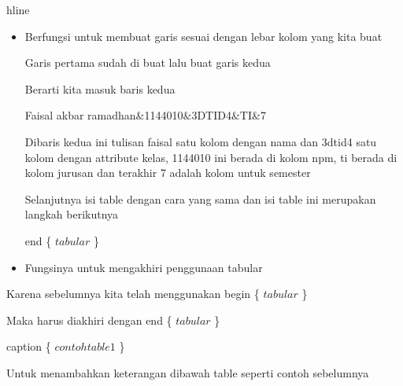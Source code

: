 \vspace{\baselineskip}
\noindent hline\par
\vspace{\baselineskip}

\begin{itemize}
	\item Berfungsi untuk membuat garis sesuai dengan lebar kolom yang kita buat\par

Garis pertama sudah di buat lalu buat garis kedua\par

Berarti kita masuk baris kedua\par

\vspace{\baselineskip}
Faisal akbar ramadhan$\&$1144010$\&$3DTID4$\&$TI$\&$7\par

Dibaris kedua ini tulisan faisal satu kolom dengan nama dan 3dtid4 satu kolom dengan attribute kelas, 1144010 ini berada di kolom npm, ti berada di kolom jurusan dan terakhir 7 adalah kolom untuk semester\par

\vspace{\baselineskip}
Selanjutnya isi table dengan cara yang sama dan isi table ini merupakan langkah berikutnya\par

\vspace{\baselineskip}
end \{ $tabular$ \} \par

\vspace{\baselineskip}
	\item Fungsinya untuk mengakhiri penggunaan tabular
\end{itemize}\par

\vspace{\baselineskip}
\noindent Karena sebelumnya kita telah menggunakan begin \{ $tabular$ \} \par


\noindent Maka harus diakhiri dengan end \{ $tabular$ \} \par


\noindent caption \{ $contoh table 1$ \} \par

\vspace{\baselineskip}
\noindent Untuk menambahkan keterangan dibawah table seperti contoh sebelumnya\par

